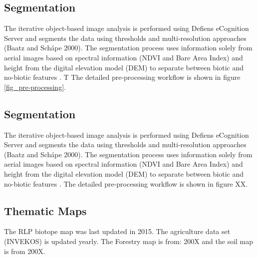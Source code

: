 \documentclass[authoryear, review,12pt,number]{elsarticle}
\begin{document}
\subsection{Segmentation}
The iterative object-based image analysis is performed using Defiens eCognition
Server and segments the data using thresholds and multi-resolution approaches
(Baatz and Sch\'ape 2000). The segmentation process uses information solely
from aerial images based on spectral information (NDVI and Bare Area Index) and
height from the digital elevation model (DEM) to separate
between biotic and no-biotic features \citep{Tintrup2015}. T 
The detailed pre-processing workflow is shown in figure
\ref{fig_pre-processing}.
\subsection{Segmentation} The iterative object-based image analysis is
performed using Defiens eCognition Server and segments the data using
thresholds and multi-resolution approaches (Baatz and Sch\'ape 2000). The
segmentation process uses information solely from aerial images based on
spectral information (NDVI and Bare Area Index) and height from the digital
elevation model (DEM) to separate between biotic and no-biotic features
\citep{Tintrup2015}. The detailed pre-processing workflow is shown in figure
XX.
\subsection{Thematic Maps} The RLP biotope map was last updated in 2015. The
agriculture data set (INVEKOS) is updated yearly. The Forestry map is from:
200X and the soil map is from 200X.
\end{document}
